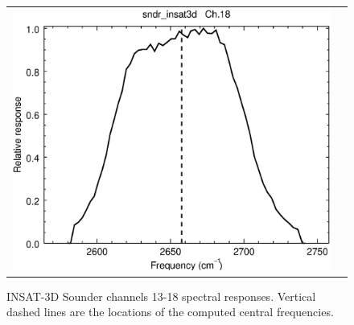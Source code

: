 \begin{figure}[H]
\begin{tabular}{c c}
    \includegraphics[scale=0.35]{graphics/sndr/srf/sndr_insat3d-18.eps}
  \end{tabular}
  \caption{INSAT-3D Sounder channels 13-18 spectral responses. Vertical dashed lines are the locations of the computed central frequencies.}
  \label{fig:sndr_ch13-18}
\end{figure}
